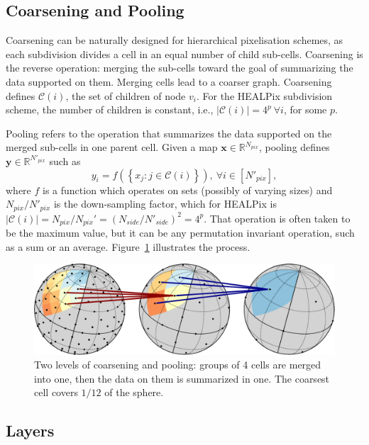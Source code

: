 \documentclass[final,twocolumn,3p,times,sort&compress]{elsarticle}
\newcommand{\figref}[1]{Figure~\ref{fig:#1}}
\renewcommand{\b}[1]{{\bm{#1}}}   %
\newcommand{\1}{\b{1}}              %
\newcommand{\0}{\b{0}}              %
\newcommand{\C}{\mathcal{C}}
\newcommand{\x}{\b{x}}
\newcommand{\y}{\b{y}}
\newcommand{\R}{\mathbb{R}}
\begin{document}
\subsection{Coarsening and Pooling}

Coarsening can be naturally designed for hierarchical pixelisation schemes, as each subdivision divides a cell in an equal number of child sub-cells.
Coarsening is the reverse operation: merging the sub-cells toward the goal of summarizing the data supported on them.
Merging cells lead to a coarser graph.
Coarsening defines $\C(i)$, the set of children of node $v_i$.
For the HEALPix subdivision scheme, the number of children is constant, i.e., $| \C(i) | = 4^p \ \forall i$, for some $p$.

Pooling refers to the operation that summarizes the data supported on the merged sub-cells in one parent cell.
Given a map $\x \in \R^{N_{pix}}$, pooling defines $\y \in \R^{N'_{pix}}$ such as
\begin{equation} \label{eqn:pooling}
	y_i = f \left( \left\{ x_j : j \in \C(i) \right\} \right), \ \forall i \in [N'_{pix}],
\end{equation}
where $f$ is a function which operates on sets (possibly of varying sizes) and $N_{pix} / {N'_{pix}}$ is the down-sampling factor, which for HEALPix is $| \C(i) | = N_{pix} / {N_{pix}}' = (N_{side} / N'_{side})^2 = 4^p$.
That operation is often taken to be the maximum value, but it can be any permutation invariant operation, such as a sum or an average.
\figref{pooling} illustrates the process.


\begin{figure}[t!]
	\centering
	\includegraphics[width=\linewidth]{figure_pooling_svg}
	\caption{Two levels of coarsening and pooling: groups of 4 cells are merged into one, then the data on them is summarized in one. The coarsest cell covers $1/12$ of the sphere.}
	\label{fig:pooling}
\end{figure}

\subsection{Layers}
\end{document}
